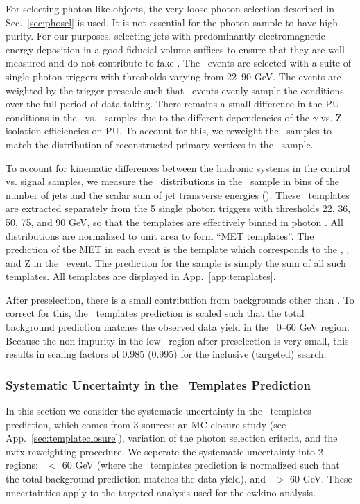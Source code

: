 For selecting photon-like objects, the very loose photon selection described in Sec.~\ref{sec:phosel} is used.
It is not essential for the photon sample to have high purity. For our purposes, selecting jets with predominantly 
electromagnetic energy deposition in a good fiducial volume suffices to ensure that 
they are well measured and do not contribute to fake \MET. The \gjets\ events are selected with a suite of
single photon triggers with \pt thresholds varying from 22--90 GeV. The events are weighted by the trigger prescale
such that \gjets\ events evenly sample the conditions over the full period of data taking.
There remains a small difference in the PU conditions in the \gjets\ vs. \zjets\ samples due to the different
dependencies of the $\gamma$ vs. Z isolation efficiencies on PU. To account for this, we reweight the \gjets\ samples
to match the distribution of reconstructed primary vertices in the \zjets\ sample.

To account for kinematic differences between the hadronic systems in the control vs. signal 
samples, we measure the \MET\ distributions in the \gjets\ sample in bins of the number of jets 
and the scalar sum of jet transverse energies (\Ht). These \MET\ templates are extracted separately from the 5 single photon
triggers with thresholds 22, 36, 50, 75, and 90 GeV, so that the templates are effectively binned in photon \pt.
All \MET distributions are normalized to unit area to form ``MET templates''.
The prediction of the MET in each \Z event is the template which corresponds to the \njets,
\Ht, and Z \pt in the \zjets\ event. The prediction for the \Z sample is simply the sum of all such templates.
All templates are displayed in App.~\ref{app:templates}.

After preselection, there is  a small contribution from backgrounds other than \zjets. To correct for this, the \MET\ templates
prediction is scaled such that the total background prediction matches the observed data yield in the \MET\ 0--60 GeV region.
Because the non-\zjets impurity in the low \MET\ region after preselection is very small, this results in 
scaling factors of 0.985 (0.995) for the inclusive (targeted) search.

\subsubsection{Systematic Uncertainty in the \MET\ Templates Prediction}

In this section we consider the systematic uncertainty in the \MET\ templates prediction, which comes from 3 sources:
an MC closure study (see App.~\ref{sec:templateclosure}), variation of the photon selection criteria, and the nvtx
reweighting procedure. We seperate the systematic uncertainty 
into 2 regions: \MET\ $<$ 60 GeV (where the \MET\ templates prediction is normalized such that the total background
prediction matches the data yield), and \MET\ $>$ 60 GeV. These uncertainties apply to the targeted analysis used for the ewkino analysis.

